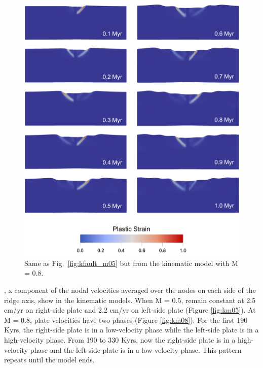 \documentclass[letterpaper,12pt,notitle]{memphisthesis}                     %
\begin{document}
\begin{figure}[!htb]
	\centering
	\includegraphics[width=0.9\linewidth]{./figs/kfault_m08.png}
	\caption{Same as Fig.~\ref{fig:kfault_m05} but from the kinematic model with M = 0.8.}
	\label{fig:kfault_m08}
\end{figure}

, x component of the nodal velocities averaged over the nodes on each side of the ridge axis, show  in the kinematic models. When M = 0.5,  remain constant at 2.5 cm/yr on right-side plate and 2.2 cm/yr on left-side plate (Figure \ref{fig:km05}). At M = 0.8, plate velocities have two phases (Figure \ref{fig:km08}). For the first 190 Kyrs, the right-side plate is in a low-velocity phase while the left-side plate is in a high-velocity phase. From 190 to 330 Kyrs, now the right-side plate is in a high-velocity phase and the left-side plate is in a low-velocity phase.  This pattern repeats until the model ends.
\end{document}
